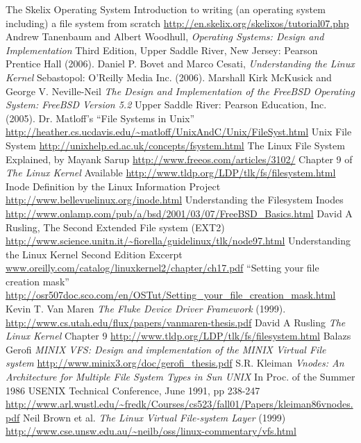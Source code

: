 \documentclass{book}
\begin{document}
{}
\begin{thebibliography}{10}
 The Skelix Operating System Introduction to writing (an operating system including) a file system from scratch \url{http://en.skelix.org/skelixos/tutorial07.php}
 Andrew Tanenbaum and Albert Woodhull, \textit{Operating Systems: Design and Implementation} Third Edition, Upper Saddle River, New Jersey: Pearson Prentice Hall (2006).
 Daniel P. Bovet and Marco Cesati, \textit{Understanding the Linux Kernel} Sebastopol: O'Reilly Media Inc. (2006).
 Marshall Kirk McKusick and George V. Neville-Neil \textit{The Design and Implementation of the FreeBSD Operating System: FreeBSD Version 5.2} Upper Saddle River: Pearson Education, Inc. (2005).
 Dr. Matloff's ``File Systems in Unix'' \url{http://heather.cs.ucdavis.edu/~matloff/UnixAndC/Unix/FileSyst.html} 
 Unix File System \url{http://unixhelp.ed.ac.uk/concepts/fsystem.html}
 The Linux File System Explained, by Mayank Sarup \url{http://www.freeos.com/articles/3102/}
 Chapter 9 of \textit{The Linux Kernel} Available \url{http://www.tldp.org/LDP/tlk/fs/filesystem.html}
 Inode Definition by the Linux Information Project \url{http://www.bellevuelinux.org/inode.html}
 Understanding the Filesystem Inodes \url{http://www.onlamp.com/pub/a/bsd/2001/03/07/FreeBSD_Basics.html}
 David A Rusling, The Second Extended File system (EXT2) \url{http://www.science.unitn.it/~fiorella/guidelinux/tlk/node97.html}
 Understanding the Linux Kernel Second Edition Excerpt \url{www.oreilly.com/catalog/linuxkernel2/chapter/ch17.pdf}
 ``Setting your file creation mask'' \url{http://osr507doc.sco.com/en/OSTut/Setting_your_file_creation_mask.html}
 Kevin T. Van Maren \textit{The Fluke Device Driver Framework} (1999). \url{http://www.cs.utah.edu/flux/papers/vanmaren-thesis.pdf}
 David A Rusling \textit{The Linux Kernel} Chapter 9 \url{http://www.tldp.org/LDP/tlk/fs/filesystem.html}
 Balazs Gerofi \textit{MINIX VFS: Design and implementation of the MINIX Virtual File system} \url{http://www.minix3.org/doc/gerofi_thesis.pdf}
 S.R. Kleiman \textit{Vnodes: An Architecture for Multiple File System Types in Sun UNIX} In Proc. of the Summer 1986 USENIX Technical Conference, June 1991, pp 238-247 \url{http://www.arl.wustl.edu/~fredk/Courses/cs523/fall01/Papers/kleiman86vnodes.pdf}
 Neil Brown et al. \textit{The Linux Virtual File-system Layer} (1999) \url{http://www.cse.unsw.edu.au/~neilb/oss/linux-commentary/vfs.html}

\end{thebibliography}
\end{document}
